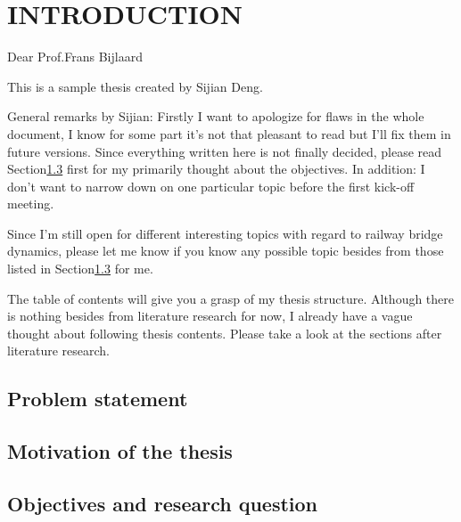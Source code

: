 

\chapter{INTRODUCTION}
Dear Prof.Frans Bijlaard

This is a sample thesis created by Sijian Deng.

General remarks by Sijian: Firstly I want to apologize for flaws in the whole document, I know for some part it's not that pleasant to read but I'll fix them in future versions. Since everything written here is not finally decided, please read Section\ref{sec:introduction} first for my primarily thought about the objectives. In addition: I don't want to narrow down on one particular topic before the first kick-off meeting. 

Since I'm still open for different interesting topics with regard to railway bridge dynamics, please let me know if you know any possible topic besides from those listed in Section\ref{sec:introduction} for me. 

The table of contents will give you a grasp of my thesis structure. Although there is nothing besides from literature research for now, I already have a vague thought about following thesis contents. Please take a look at the sections after literature research. 

\section{Problem statement}
\section{Motivation of the thesis}
\section{Objectives and research question}\label{sec:introduction}


